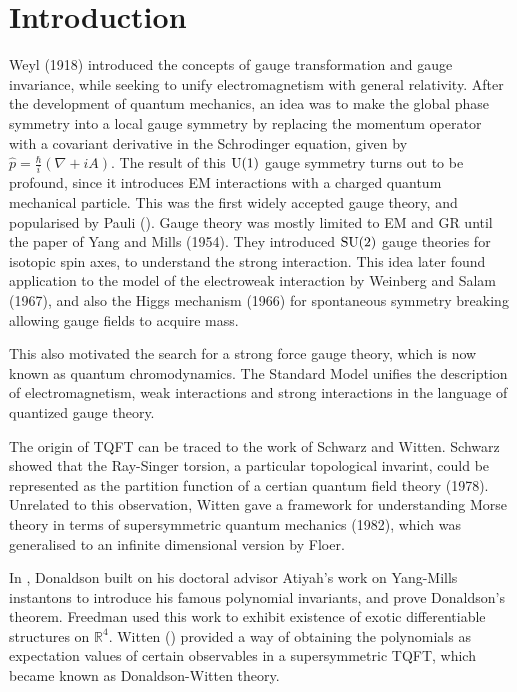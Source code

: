 \chapter*{Introduction}

Weyl (1918) introduced the concepts of gauge transformation and gauge
invariance, while seeking to unify electromagnetism with general relativity. After the
development of quantum mechanics, an idea was to make the global phase symmetry
into a local gauge symmetry by replacing the momentum operator with a covariant 
derivative in the Schrodinger equation, given by 
$\widehat{p}=\frac{\hbar}{i}(\nabla+iA)$. The result of this $\operatorname{U}(1)$ gauge symmetry
turns out to be profound, since it introduces EM interactions with a charged
quantum mechanical particle. This was the first widely accepted gauge theory,
and popularised by Pauli (\citeyear{pauli_em}).\cite{pauli_em}
Gauge theory was mostly limited to EM and GR until the paper of Yang and Mills 
(1954). They introduced $\operatorname{SU}(2)$ gauge theories for
isotopic spin axes, to understand the strong interaction. This idea later found
application to the model of the electroweak interaction by Weinberg and Salam
(1967), and also the Higgs mechanism (1966) for spontaneous symmetry breaking
allowing gauge fields to acquire mass. 

This also motivated the search for a strong force gauge theory, which is now
known as quantum chromodynamics. The Standard Model unifies the description of
electromagnetism, weak interactions and strong interactions in the language of
quantized gauge theory. 

The origin of TQFT can be traced to the work of Schwarz and Witten.
Schwarz showed that the Ray-Singer torsion, a particular topological invarint,
could be represented as the partition function of a certian quantum field theory
(1978). Unrelated to this observation, Witten gave a framework for understanding
Morse theory in terms of supersymmetric quantum mechanics (1982), which was 
generalised to an infinite dimensional version by Floer. 

In \citeyear{don83}, Donaldson built on his doctoral advisor Atiyah's work on 
Yang-Mills instantons to introduce his famous polynomial invariants, and prove 
Donaldson's theorem.\cite{don83}
Freedman used this work to exhibit existence of exotic differentiable
structures on $\mathbb{R}^{4}$. 
Witten (\citeyear{wittenTQFT}) provided a way
of obtaining the polynomials as expectation values of certain observables in 
a supersymmetric TQFT, which became
known as Donaldson-Witten theory.\cite{wittenTQFT}

